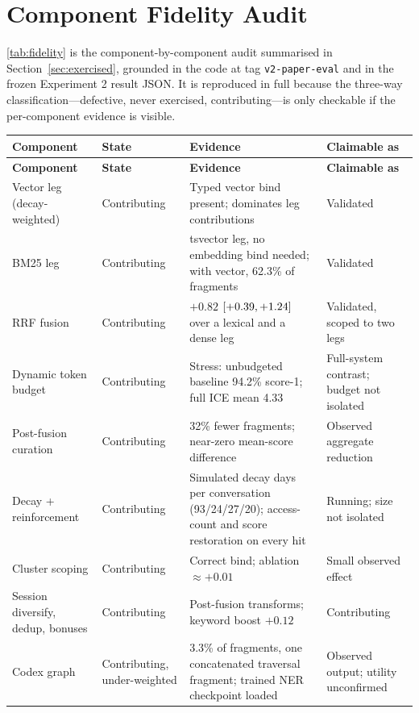 \documentclass[twoside,11pt]{article}
\renewcommand{\arraystretch}{1.15}
\begin{document}
\appendix

\FloatBarrier
\section{Component Fidelity Audit}
\label{app:fidelity}

\cref{tab:fidelity} is the component-by-component audit summarised in Section~\ref{sec:exercised}, grounded in the code at tag \texttt{v2-paper-eval} and in the frozen Experiment 2 result JSON. It is reproduced in full because the three-way classification---defective, never exercised, contributing---is only checkable if the per-component evidence is visible.

\begingroup
\footnotesize
\renewcommand{\arraystretch}{1.04}


\begin{longtable}{@{}L{2.6cm}L{2.0cm}L{5.1cm}L{2.9cm}@{}}
\toprule
\textbf{Component} & \textbf{State} & \textbf{Evidence} & \textbf{Claimable as} \\
\midrule
\endfirsthead
\toprule
\textbf{Component} & \textbf{State} & \textbf{Evidence} & \textbf{Claimable as} \\
\midrule
\endhead
Vector leg (decay-weighted) & Contributing & Typed vector bind present; dominates leg contributions & Validated \\
BM25 leg & Contributing & tsvector leg, no embedding bind needed; with vector, 62.3\% of fragments & Validated \\
RRF fusion & Contributing & $+0.82$ $[+0.39,+1.24]$ over a lexical and a dense leg & Validated, scoped to two legs \\
Dynamic token budget & Contributing & Stress: unbudgeted baseline 94.2\% score-1; full ICE mean 4.33 & Full-system contrast; budget not isolated \\
Post-fusion curation & Contributing & 32\% fewer fragments; near-zero mean-score difference & Observed aggregate reduction \\
Decay + reinforcement & Contributing & Simulated decay days per conversation (93/24/27/20); access-count and score restoration on every hit & Running; size not isolated \\
Cluster scoping & Contributing & Correct bind; ablation $\approx +0.01$ & Small observed effect \\
Session diversify, dedup, bonuses & Contributing & Post-fusion transforms; keyword boost $+0.12$ & Contributing \\
Codex graph & Contributing, under-weighted & 3.3\% of fragments, one concatenated traversal fragment; trained NER checkpoint loaded & Observed output; utility unconfirmed \\

\end{longtable}
\end{document}
